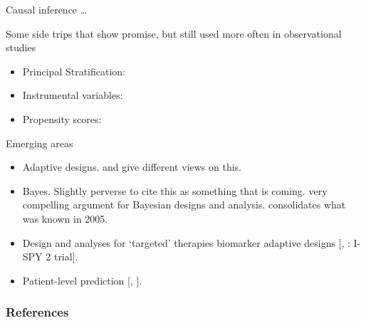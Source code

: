 \documentclass[11pt]{beamer}
\begin{document}
\begin{frame}{Causal inference \ldots}
	
Some side trips that show promise, but still used more often in observational studies

\begin{itemize}
	\item Principal Stratification: \cite{frangakis2002principal}
	
	\item Instrumental variables: \cite{angrist1996identification} 
	
	\item Propensity scores: \cite{rosenbaum1983central}
\end{itemize}
	
\end{frame}

\begin{frame}{Emerging areas}
    
\begin{itemize}
    \item Adaptive designs.  \cite{tsiatis2003inefficiency} and \cite{gallo2006adaptive} give different views on this.
    
    \item Bayes.  Slightly perverse to cite this as something that is coming. \cite{spiegelhalter1994bayesian} very compelling argument for Bayesian designs and analysis.  \cite{ibrahim2005bayesian} consolidates what was known in 2005.
    
    \item Design and analyses for `targeted' therapies biomarker adaptive designs [\cite{jiang2007biomarker}, \cite{barker2009spy}: I-SPY 2 trial].
    
    \item Patient-level prediction [\cite{graf1999assessment}, \cite{gerds2008performance}].

\end{itemize}
	
\end{frame} 


\begin{frame}[allowframebreaks]
\frametitle{References}

\end{frame}
\end{document}
